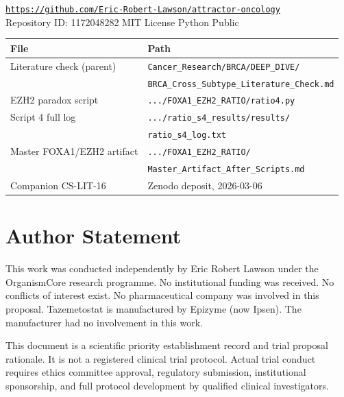 \documentclass[12pt, a4paper]{article}
\begin{document}
\begin{center}
\href{https://github.com/Eric-Robert-Lawson/attractor-oncology}
{\texttt{https://github.com/Eric-Robert-Lawson/attractor-oncology}}\\[0.3em]
\small Repository ID: 1172048282 \textbar{}
MIT License \textbar{}
Python \textbar{}
Public
\end{center}

\begin{center}
\begin{tabular}{ll}
\toprule
\textbf{File} & \textbf{Path} \\
\midrule
Literature check (parent)
& \texttt{Cancer\_Research/BRCA/DEEP\_DIVE/}\\
& \texttt{BRCA\_Cross\_Subtype\_Literature\_Check.md} \\
EZH2 paradox script
& \texttt{.../FOXA1\_EZH2\_RATIO/ratio4.py} \\
Script 4 full log
& \texttt{.../ratio\_s4\_results/results/}\\
& \texttt{ratio\_s4\_log.txt} \\
Master FOXA1/EZH2 artifact
& \texttt{.../FOXA1\_EZH2\_RATIO/}\\
& \texttt{Master\_Artifact\_After\_Scripts.md} \\
Companion CS-LIT-16
& Zenodo deposit, 2026-03-06 \\
\bottomrule
\end{tabular}
\end{center}

\section*{Author Statement}

This work was conducted independently by Eric Robert
Lawson under the OrganismCore research programme.
No institutional funding was received. No conflicts
of interest exist. No pharmaceutical company was
involved in this proposal. Tazemetostat is manufactured
by Epizyme (now Ipsen). The manufacturer had no
involvement in this work.

This document is a scientific priority establishment
record and trial proposal rationale. It is not a
registered clinical trial protocol. Actual trial
conduct requires ethics committee approval, regulatory
submission, institutional sponsorship, and full
protocol development by qualified clinical
investigators.
\end{document}
